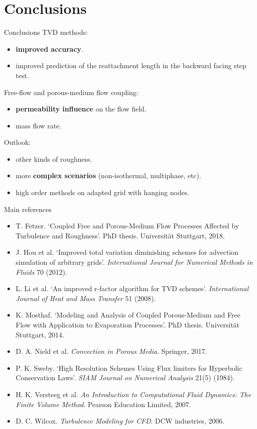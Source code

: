 \documentclass{beamer}
\begin{document}
\section{Conclusions}
\begin{frame}{Conclusions}
TVD methods:
\begin{itemize}
	\item \textbf{improved accuracy}.
	\item improved prediction of the reattachment length in the backward facing step test.
\end{itemize}
Free-flow and porous-medium flow coupling:
\begin{itemize}
	\item \textbf{permeability influence} on the flow field.
	\item mass flow rate.
\end{itemize}
Outlook:
\begin{itemize}
	\item other kinds of roughness.
	\item more \textbf{complex scenarios} (non-isothermal, multiphase, etc).
	\item high order methods on adapted grid with hanging nodes.
\end{itemize}
\end{frame}
\begin{frame}{Main references}
\begin{itemize}
	\footnotesize
	\item T. Fetzer. `Coupled Free and Porous-Medium Flow Processes Affected by 
	Turbulence and Roughness'. PhD thesis. Universit\"at Stuttgart, 2018.
	\item J. Hou et al. `Improved total variation diminishing schemes for 
	advection simulation of arbitrary grids'. \emph{International Journal for 
		Numerical Methods in Fluids} 70 (2012).
	\item L. Li et al. `An improved r-factor algorithm for TVD schemes'. 
	\emph{International Journal of Heat and Mass Transfer} 51 (2008).
	\item K. Mosthaf. `Modeling and Analysis of Coupled  Porous-Medium and Free 
	Flow with Application to Evaporation Processes'. PhD thesis. Universit\"at 
	Stuttgart, 2014.
	\item D. A. Nield et al. \emph{Convection in Porous Media}. Springer, 2017.
	\item P. K. Sweby. `High Resolution Schemes Using Flux limiters for 
	Hyperbolic Conservation Laws'. \emph{SIAM Journal on Numerical Analysis} 
	21(5) (1984).
	\item H. K. Versteeg et al. \emph{An Introduction to Computational Fluid 
		Dynamics: The Finite Volume Method}. Pearson Education Limited, 2007.
	\item D. C. Wilcox. \emph{Turbulence Modeling for CFD}. DCW industries, 
	2006. 
\end{itemize}
\end{frame}
\end{document}
